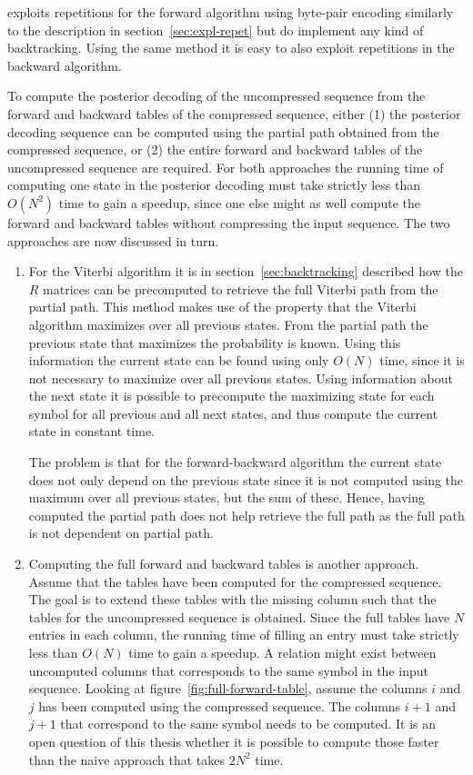 \citet{sand2013ziphmmlib} exploits repetitions for the forward algorithm using
byte-pair encoding similarly to the description in
section~\ref{sec:expl-repet} but do implement any kind of backtracking. Using
the same method it is easy to also exploit repetitions in the backward
algorithm.

To compute the posterior decoding of the uncompressed sequence from the
forward and backward tables of the compressed sequence, either (1) the
posterior decoding sequence can be computed using the partial path obtained
from the compressed sequence, or (2) the entire forward and backward tables of
the uncompressed sequence are required. For both approaches the running time of
computing one state in the posterior decoding must take strictly less than
$O(N^2)$ time to gain a speedup, since one else might as well compute the
forward and backward tables without compressing the input sequence. The two
approaches are now discussed in turn.

\begin{enumerate}
\item For the Viterbi algorithm it is in section~\ref{sec:backtracking}
  described how the $R$ matrices can be precomputed to retrieve the full
  Viterbi path from the partial path. This method makes use of the property
  that the Viterbi algorithm maximizes over all previous states. From the
  partial path the previous state that maximizes the probability is known. Using
  this information the current state can be found using only $O(N)$ time, since
  it is not necessary to maximize over all previous states. Using information
  about the next state it is possible to precompute the maximizing state for
  each symbol for all previous and all next states, and thus compute the
  current state in constant time.

  The problem is that for the forward-backward algorithm the current state does
  not only depend on the previous state since it is not computed using the
  maximum over all previous states, but the sum of these. Hence, having computed
  the partial path does not help retrieve the full path as the full path is
  not dependent on partial path.
\item Computing the full forward and backward tables is another approach.
  Assume that the tables have been computed for the compressed sequence. The
  goal is to extend these tables with the missing column such that the tables
  for the uncompressed sequence is obtained. Since the full tables have $N$
  entries in each column, the running time of filling an entry must take
  strictly less than $O(N)$ time to gain a speedup. A relation might exist
  between uncomputed columns that corresponds to the same symbol in the input
  sequence. Looking at figure~\ref{fig:full-forward-table}, assume the columns
  $i$ and $j$ has been computed using the compressed sequence. The columns
  $i + 1$ and $j + 1$ that correspond to the same symbol needs to be computed.
  It is an open question of this thesis whether it is possible to compute those
  faster than the naive approach that takes $2N^2$ time.
\end{enumerate}

